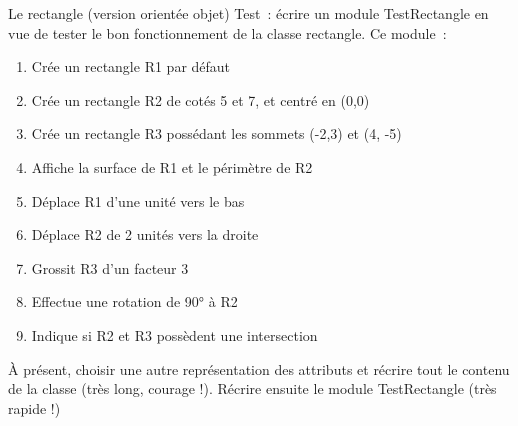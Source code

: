 \begin{Exercice}{Le rectangle (version orientée objet)}
	Test~: écrire un module TestRectangle en vue de tester le bon
	fonctionnement de la classe rectangle. Ce module~: 

	\begin{enumerate}[label=\alph*)]
		\item 
			Crée un rectangle R1 par défaut
		\item 
			Crée un rectangle R2 de cotés 5 et 7, et centré en (0,0)
		\item 
			Crée un rectangle R3 possédant les sommets (-2,3) et (4, -5)
		\item 
			Affiche la surface de R1 et le périmètre de R2
		\item 
			Déplace R1 d’une unité vers le bas
		\item 
			Déplace R2 de 2 unités vers la droite
		\item 
			Grossit R3 d’un facteur 3
		\item 
			Effectue une rotation de 90° à R2
		\item 
			Indique si R2 et R3 possèdent une intersection
	\end{enumerate}

	À présent, choisir une autre représentation des attributs et récrire
	tout le contenu de la classe (très long, courage !).
	Récrire ensuite le
	module TestRectangle (très rapide !)
\end{Exercice}
